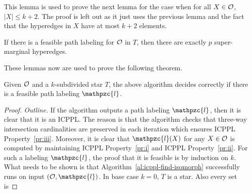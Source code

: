 \documentclass[11pt,
               envcountsect,
               envcountsame]
               {../lib/llncs2e/llncs}
\def\cO{{\cal O}}
\def\cl{\mathpzc{l}}
\def\icpplpr{Property}
\begin{document}
This lemma is used to prove the next lemma for the case when for all
$X \in \cO$, $|X| \leq k+2$.  The proof is left out as it just uses
the previous lemma and the fact that the hyperedges in $X$ have at
most $k+2$ elements.
\begin{lemma}
  If there is a feasible path labeling for $\cO$ in $T$, then there
  are exactly $p$ super-marginal hyperedges.
\end{lemma}
These lemmas now are used to prove the following theorem.
\begin{theorem}
  Given $\cO$ and a $k$-subdivided star $T$, the above algorithm
  decides correctly if there is a feasible path labeling $\cl$.
\end{theorem}
\begin{proof} {\em Outline.}
  If the algorithm outputs a path labeling $\cl$, then it is clear
  that it is an ICPPL. The reason is that the algorithm checks that
  three-way intersection cardinalities are preserved in each iteration
  which ensures ICPPL \icpplpr~\ref{pr:iii}. Moreover, it is clear
  that $\cl(X)$ for any $X \in \cO$ is computed by maintaining ICPPL
  \icpplpr~\ref{pr:i} and ICPPL \icpplpr~\ref{pr:ii}. For such a
  labeling $\cl$, the proof that it is feasible is by induction on
  $k$. What needs to be shown is that
  Algorithm~\ref{al:icppl-find-isomorph} successfully runs on input
  $(\cO, \cl)$. In base case $k=0$, $T$ is a star. Also every set is

\end{proof}
\end{document}
